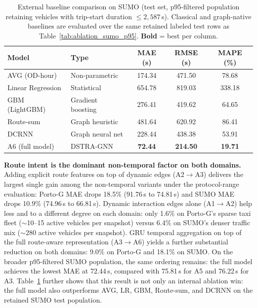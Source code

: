 \documentclass[pdflatex,sn-basic,Numbered]{sn-jnl}%
\begin{document}
\begin{table}[t]
    \centering
    \caption{External baseline comparison on SUMO (test set, p95-filtered population retaining vehicles with trip-start duration $\leq 2{,}587$\,s). Classical and graph-native baselines are evaluated over the same retained labeled test rows as Table~\ref{tab:ablation_sumo_p95}. \textbf{Bold} = best per column.}
    \label{tab:baselines_sumo_p95}
    {\footnotesize\setlength{\tabcolsep}{4pt}%
    \begin{tabular}{@{}llccc@{}}
        \toprule
        \textbf{Model} & \textbf{Type} & \textbf{MAE (s)} & \textbf{RMSE (s)} & \textbf{MAPE (\%)} \\
        \midrule
        AVG (OD-hour)       & Non-parametric   & 174.34 & 471.50 & 78.68 \\
        Linear Regression   & Statistical      & 654.78 & 819.03 & 338.18 \\
        GBM (LightGBM)      & Gradient boosting & 276.41 & 419.62 & 64.65 \\
        Route-sum           & Graph heuristic  & 481.64 & 620.92 & 86.41 \\
        DCRNN~\cite{dcrnn2018} & Graph neural net & 228.44 & 438.38 & 53.91 \\
        A6 (full model)     & DSTRA-GNN        & \textbf{72.44} & \textbf{214.50} & \textbf{19.71} \\
        \bottomrule
    \end{tabular}}%
\end{table}

\textbf{Route intent is the dominant non-temporal factor on both domains.} Adding explicit route features on top of dynamic edges (A2$\to$A3) delivers the largest single gain among the non-temporal variants under the protocol-range evaluation: Porto-G MAE drops 18.5\% (91.76\,s to 74.81\,s) and SUMO MAE drops 10.9\% (74.96\,s to 66.81\,s). Dynamic interaction edges alone (A1$\to$A2) help less and to a different degree on each domain: only 1.6\% on Porto-G's sparse taxi fleet ($\sim$10--15 active vehicles per snapshot) versus 6.4\% on SUMO's denser traffic mix ($\sim$280 active vehicles per snapshot). GRU temporal aggregation on top of the full route-aware representation (A3$\to$A6) yields a further substantial reduction on both domains: 9.0\% on Porto-G and 18.1\% on SUMO. On the broader p95-filtered SUMO population, the same ordering remains: the full model achieves the lowest MAE at 72.44\,s, compared with 75.81\,s for A5 and 76.22\,s for A3. Table~\ref{tab:baselines_sumo_p95} further shows that this result is not only an internal ablation win: the full model also outperforms AVG, LR, GBM, Route-sum, and DCRNN on the retained SUMO test population.
\end{document}
